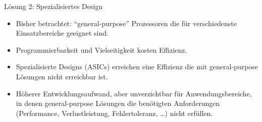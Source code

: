 \begin{frame}

	\begin{block}{Lösung 2: Spezialisiertes Design}
		\begin{itemize}
			\item Bisher betrachtet: ``general-purpose'' Prozessoren die für
				verschiedenste Einsatzbereiche geeignet sind.
			\item Programmierbarkeit und Vielseitigkeit kosten Effizienz.
			\item Spezialisierte Designs (ASICs) erreichen eine Effizienz die
				mit general-purpose Lösungen nicht erreichbar ist.
			\item Höherer Entwicklungsaufwand, aber unverzichtbar für
				Anwendungsbereiche, in denen general-purpose Lösungen die
				benötigten Anforderungen (Performance, Verlustleistung,
				Fehlertoleranz, \ldots) nicht erfüllen.
		\end{itemize}
	\end{block}

\end{frame}
